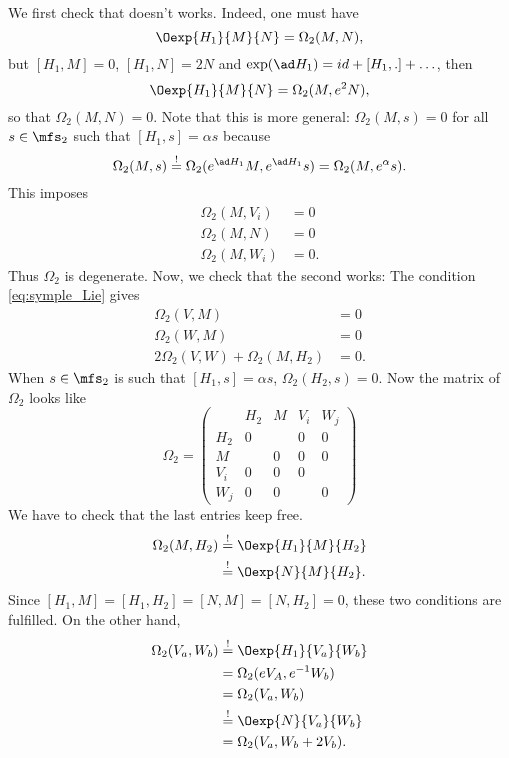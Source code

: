 We first check that
doesn't works.
Indeed, one must have
\[
   \Oexp{H_1}{M}{N}=\Omega_2(M,N),
\]
but $[H_1,M]=0$, $[H_1,N]=2N$ and $\exp(\ad H_1)=id+[H_1,.]+\ldots$, then
\[
  \Oexp{H_1}{M}{N}=\Omega_2(M,e^2N),
\]
so that $\Omega_2(M,N)=0$.
Note that this is more general: $\Omega_2(M,s)=0$ for all $s\in\mfs_2$ such that $[H_1,s]=\alpha s$ because
\[
   \Omega_2(M,s)\stackrel{!}{=}\Omega_2(e^{\ad H_1}M,e^{\ad H_1}s)=\Omega_2(M,e^{\alpha}s).
\]
This imposes
\begin{equation}
\begin{split}
   \Omega_2(M,V_i)&=0\\
   \Omega_2(M,N)&=0\\
   \Omega_2(M,W_i)&=0.
\end{split}
\end{equation}
Thus $\Omega_2$ is degenerate. Now, we check that the second works:
The condition \eqref{eq:symple_Lie} gives
\begin{equation}
\begin{split}
   \Omega_2(V,M)&=0\\
   \Omega_2(W,M)&=0\\
   2\Omega_2(V,W)+\Omega_2(M,H_2)&=0.
\end{split}
\end{equation}
When $s\in\mfs_2$ is such that $[H_1,s]=\alpha s$, $\Omega_2(H_2,s)=0$. Now the matrix of $\Omega_2$ looks like
\begin{equation}
\Omega_2=\left(
\begin{array}{c|c|c|c|c}
 & H_2 & M & V_i & W_j \\ 
 \hline
H_2 & 0 &  & 0 & 0 \\ 
\hline
M &  & 0 & 0 & 0 \\ 
\hline
V_i & 0 & 0 & 0 &  \\ 
\hline
W_j & 0 & 0 &  & 0
\end{array}
\right)
\end{equation}
We have to check that the last entries keep free.
\begin{equation} \begin{split}
   \Omega_2(M,H_2)&\stackrel{!}{=}\Oexp{H_1}{M}{H_2}\\
                  &\stackrel{!}{=}\Oexp{N}{M}{H_2}.
\end{split}
\end{equation}
Since $[H_1,M]=[H_1,H_2]=[N,M]=[N,H_2]=0$, these two conditions are fulfilled. On the other hand,
\begin{equation}
\begin{split}
   \Omega_2(V_a,W_b)&\stackrel{!}{=}\Oexp{H_1}{V_a}{W_b}\\
                    &=\Omega_2(eV_A,e^{-1} W_b)\\
		    &=\Omega_2(V_a,W_b)\\
		    &\stackrel{!}{=}\Oexp{N}{V_a}{W_b}\\
		    &=\Omega_2(V_a,W_b+2V_b).
\end{split}
\end{equation}
